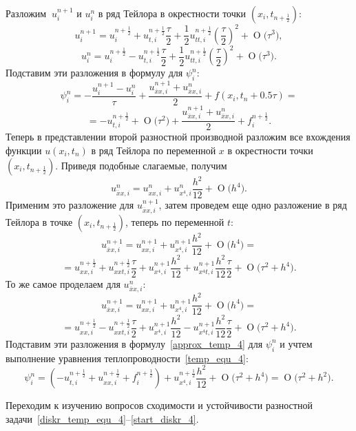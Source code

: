 \documentclass[11pt,a4paper,twoside]{report}
\numberwithin{equation}{section}
\theoremstyle{definition}
\theoremstyle{plain}
\newcommand{\bigO}[1]{\ensuremath{\operatorname{O}\bigl(#1\bigr)}}
\begin{document}
\begin{solution}
%
    Разложим $~u_i^{n + 1}$ и $u_i^n $ в ряд Тейлора в
    окрестности точки $(x_i,t_{n + \frac12})$:
    $$
        u_i^{n + 1} = u_i^{n + \frac12} + u_{t,i}^{n + \frac12}\dfrac{\tau}2 +
        \dfrac12 u_{tt,i}^{n + \frac12}\left(\dfrac{\tau}{2}\right)^2 +
        \bigO{\tau^3},
    $$
    $$
        u_i^{n} = u_i^{n + \frac12} - u_{t,i}^{n + \frac12}\dfrac{\tau}2 +
        \dfrac12 u_{tt,i}^{n + \frac12}\left(\dfrac{\tau}{2}\right)^2 +
        \bigO{\tau^3}.
    $$
    Подставим эти разложения в формулу для $\psi_i^n$:
    $$
        \psi_i^n =  -\dfrac{u_i^{n + 1} - u_i^n}{\tau} +
        \frac{u_{\overline{x}x,i}^{n + 1} + u_{\overline{x}x,i}^{n}}{2}
        + f(x_i,t_n + 0.5\tau) =
    $$
    $$
        = -u_{t,i}^{n + \frac12} + \bigO{\tau^2} + \frac{u_{\overline{x}x,i}^{n + 1}
        + u_{\overline{x}x,i}^{n}}{2} + f_i^{n + \frac12}.
    $$
    Теперь в представлении второй разностной производной разложим все вхождения
    функции $u(x_i, t_n)$ в ряд Тейлора по переменной $x$
    в окрестности точки $(x_i,t_{n + \frac12})$.
    Приведя подобные слагаемые, получим
    $$
        u_{\overline{x}x,i}^{n} = u_{xx,i}^{n} + u_{x^4,i}^{n}\dfrac{h^2}{12} +
        \bigO{h^4}.
    $$
    Применим это разложение для $u_{\overline{x}x,i}^{n + 1}$, затем проведем
    еще одно разложение в ряд Тейлора в точке $(x_i, t_{n + \frac12})$,
    теперь по переменной $t$:
    $$
        u_{\overline{x}x,i}^{n + 1} = u_{xx,i}^{n + 1} + u_{x^4,i}^{n + 1}\dfrac{h^2}{12}
        + \bigO{h^4} =
    $$
    $$
        = u_{xx,i}^{n + \frac12} + u_{xxt,i}^{n + \frac12}\dfrac{\tau}{2} +
        u_{x^4,i}^{n + 1}\dfrac{h^2}{12} + u_{x^4t,i}^{n + 1}\dfrac{h^2}{12}\dfrac{\tau}{2}
        + \bigO{\tau^2 + h^4}.
    $$
    То же самое проделаем для $u_{\overline{x}x,i}^{n}$:
    $$
        u_{\overline{x}x,i}^{n + 1} = u_{xx,i}^{n + 1} + u_{x^4,i}^{n + 1}\dfrac{h^2}{12}
        + \bigO{h^4} =
    $$
    $$
        = u_{xx,i}^{n + \frac12} - u_{xxt,i}^{n + \frac12}\dfrac{\tau}{2} +
        u_{x^4,i}^{n + 1}\dfrac{h^2}{12} - u_{x^4t,i}^{n+1}
        \dfrac{h^2}{12}\dfrac{\tau}{2} + \bigO{\tau^2 + h^4}.
    $$
    Подставим эти разложения в формулу~\eqref{approx_temp_4} для $\psi_i^n$
    и учтем выполнение уравнения теплопроводности~\eqref{temp_equ_4}:
    $$
        \psi_i^n = (-u_{t,i}^{n + \frac12} + u_{xx,i}^{n + \frac12} + f_i^{n + \frac12})
        + u_{x^4,i}^{n + \frac12}\dfrac{h^2}{12} + \bigO{\tau^2 + h^4} =
        \bigO{\tau^2 + h^2}.
    $$
%
\end{solution}
%
\fi
Переходим к изучению вопросов сходимости и устойчивости разностной
задачи~\eqref{diskr_temp_equ_4}--\eqref{start_diskr_4}.
\end{document}
